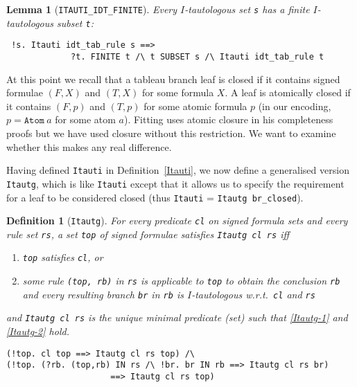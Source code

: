 \documentclass[a4paper]{article}
\newtheorem{lemma}{Lemma}
\newtheorem{definition}{Definition}
\begin{document}
\begin{lemma}[\texttt{ITAUTI\_IDT\_FINITE}]\label{ITAUTI-IDT-FINITE}
Every $I$-tautologous set \texttt{s} has
a finite $I$-tautologous subset \texttt{t}:
\end{lemma}
\begin{verbatim}
 !s. Itauti idt_tab_rule s ==>
             ?t. FINITE t /\ t SUBSET s /\ Itauti idt_tab_rule t
\end{verbatim}

At this point we recall that a tableau branch leaf is closed if it contains
signed formulae $(F, X)$ and $(T, X)$ for some formula $X$.
A leaf is atomically closed if it contains $(F, p)$ and $(T, p)$
for some atomic formula $p$ (in our encoding, $p = \texttt{Atom}\ a$ for some
atom $a$).
Fitting \cite[Definition~2]{fitting-dual-tableau} uses atomic closure
in his completeness proofs but
we have used closure without this restriction. We 
want to examine whether this makes any real difference.

Having defined \texttt{Itauti} in Definition~\ref{Itauti},
we now define a generalised version \texttt{Itautg},
which is like \texttt{Itauti} except that it allows us
to specify the requirement for a leaf to be considered closed
(thus \texttt{Itauti} = \texttt{Itautg br\_closed}).

\begin{definition}[\texttt{Itautg}]\label{Itautg} 
  For every predicate \texttt{cl} on signed formula sets and
  every rule set \texttt{rs}, a set \texttt{top} of signed
  formulae satisfies \texttt{Itautg cl rs} iff
  \begin{enumerate} 
  \item \label{Itautg-1}
    \texttt{top} satisfies \texttt{cl}, or
  \item \label{Itautg-2}
   some rule \texttt{(top, rb)} in \texttt{rs} 
   is applicable to \texttt{top} to obtain the conclusion \texttt{rb} 
   and every resulting branch \texttt{br} in \texttt{rb} is
  $I$-tautologous w.r.t.\ \texttt{cl} and \texttt{rs}
  \end{enumerate} 
  and \texttt{Itautg cl rs} is the unique minimal predicate (set) such that
  \ref{Itautg-1} and \ref{Itautg-2} hold.
\begin{verbatim} 
(!top. cl top ==> Itautg cl rs top) /\ 
(!top. (?rb. (top,rb) IN rs /\ !br. br IN rb ==> Itautg cl rs br)  
                     ==> Itautg cl rs top)
\end{verbatim}
\end{definition}
\end{document}
